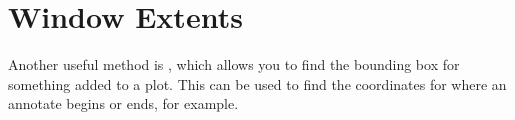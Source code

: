 



\section{Window Extents}

Another useful method is , which allows you to find the bounding box for something added to a plot. This can be used to find the coordinates for where an annotate begins or ends, for example. 